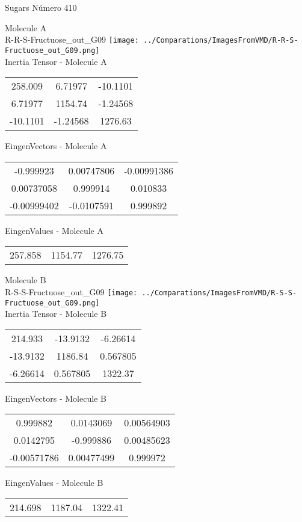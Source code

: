 \vtab[-2cm]
\begin{center}
{\large Sugars \tab Número 410}
\end{center}
\begin{multicols}{2}
\begin{center}

Molecule A \\ 
R-R-S-Fructuose\_out\_G09
\texttt{[image: ../Comparations/ImagesFromVMD/R-R-S-Fructuose\_out\_G09.png]}
\\
Inertia Tensor - Molecule A \\
\vtab

\begin{tabular}{|c c c|}
258.009	 & 	6.71977	 & 	-10.1101	 \\
6.71977	 & 	1154.74	 & 	-1.24568	 \\
-10.1101	 & 	-1.24568	 & 	1276.63
\end{tabular}

\vtab
 EingenVectors - Molecule A     \\
\vtab
\begin{tabular}{|c c c|}
-0.999923	 & 	0.00747806	 & 	-0.00991386	 \\
0.00737058	 & 	0.999914	 & 	0.010833	 \\
-0.00999402	 & 	-0.0107591	 & 	0.999892
\end{tabular}

\vtab
 EingenValues - Molecule A     \\
\vtab
\begin{tabular}{|c c c|}
257.858	 & 	1154.77	 & 	1276.75	 \\
\end{tabular}
\columnbreak

Molecule B \\ 
R-S-S-Fructuose\_out\_G09
\texttt{[image: ../Comparations/ImagesFromVMD/R-S-S-Fructuose\_out\_G09.png]}
\\
Inertia Tensor - Molecule B \\
\vtab

\begin{tabular}{|c c c|}
214.933	 & 	-13.9132	 & 	-6.26614	 \\
-13.9132	 & 	1186.84	 & 	0.567805	 \\
-6.26614	 & 	0.567805	 & 	1322.37
\end{tabular}

\vtab
 EingenVectors - Molecule B     \\
\vtab
\begin{tabular}{|c c c|}
0.999882	 & 	0.0143069	 & 	0.00564903	 \\
0.0142795	 & 	-0.999886	 & 	0.00485623	 \\
-0.00571786	 & 	0.00477499	 & 	0.999972
\end{tabular}

\vtab
 EingenValues - Molecule B     \\
\vtab
\begin{tabular}{|c c c|}
214.698	 & 	1187.04	 & 	1322.41	 \\
\end{tabular}

\end{center}
\end{multicols}
